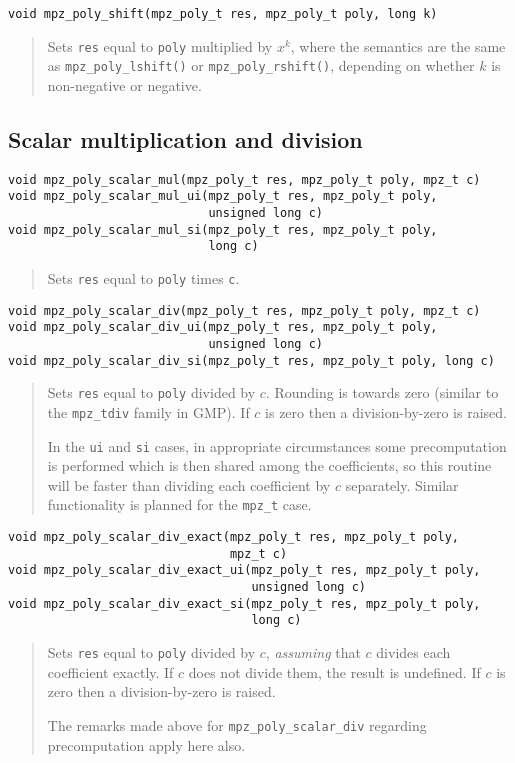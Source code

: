 \documentclass[a4paper,10pt]{article}
\newcommand{\code}{\lstinline}
\begin{document}
\begin{lstlisting}
void mpz_poly_shift(mpz_poly_t res, mpz_poly_t poly, long k)
\end{lstlisting}
\begin{quote}
Sets \code{res} equal to \code{poly} multiplied by $x^k$, where the semantics are the same as \code{mpz_poly_lshift()} or \code{mpz_poly_rshift()}, depending on whether $k$ is non-negative or negative.
\end{quote}


\subsection{Scalar multiplication and division}

\begin{lstlisting}
void mpz_poly_scalar_mul(mpz_poly_t res, mpz_poly_t poly, mpz_t c)
void mpz_poly_scalar_mul_ui(mpz_poly_t res, mpz_poly_t poly,
                            unsigned long c)
void mpz_poly_scalar_mul_si(mpz_poly_t res, mpz_poly_t poly,
                            long c)
\end{lstlisting}
\begin{quote}
Sets \code{res} equal to \code{poly} times \code{c}.
\end{quote}

\begin{lstlisting}
void mpz_poly_scalar_div(mpz_poly_t res, mpz_poly_t poly, mpz_t c)
void mpz_poly_scalar_div_ui(mpz_poly_t res, mpz_poly_t poly,
                            unsigned long c)
void mpz_poly_scalar_div_si(mpz_poly_t res, mpz_poly_t poly, long c)
\end{lstlisting}
\begin{quote}
Sets \code{res} equal to \code{poly} divided by $c$. Rounding is towards zero (similar to the \code{mpz_tdiv} family in GMP). If $c$ is zero then a division-by-zero is raised.

In the \code{ui} and \code{si} cases, in appropriate circumstances some precomputation is performed which is then shared among the coefficients, so this routine will be faster than dividing each coefficient by $c$ separately. Similar functionality is planned for the \code{mpz_t} case.
\end{quote}


\begin{lstlisting}
void mpz_poly_scalar_div_exact(mpz_poly_t res, mpz_poly_t poly,
                               mpz_t c)
void mpz_poly_scalar_div_exact_ui(mpz_poly_t res, mpz_poly_t poly,
                                  unsigned long c)
void mpz_poly_scalar_div_exact_si(mpz_poly_t res, mpz_poly_t poly,
                                  long c)
\end{lstlisting}
\begin{quote}
Sets \code{res} equal to \code{poly} divided by $c$, \emph{assuming} that $c$ divides each coefficient exactly. If $c$ does not divide them, the result is undefined. If $c$ is zero then a division-by-zero is raised.

The remarks made above for \code{mpz_poly_scalar_div} regarding precomputation apply here also.
\end{quote}
\end{document}

